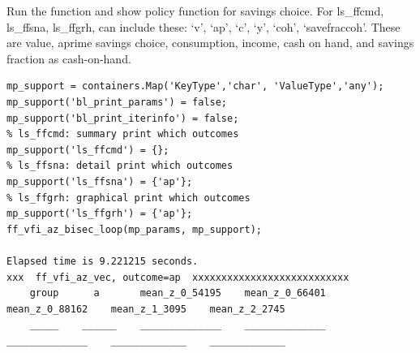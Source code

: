\documentclass[
]{book}
\begin{document}
Run the function and show policy function for savings choice. For
ls\_ffcmd, ls\_ffsna, ls\_ffgrh, can include these: `v', `ap', `c', `y',
`coh', `savefraccoh'. These are value, aprime savings choice,
consumption, income, cash on hand, and savings fraction as cash-on-hand.

\begin{verbatim}
mp_support = containers.Map('KeyType','char', 'ValueType','any');
mp_support('bl_print_params') = false;
mp_support('bl_print_iterinfo') = false;
% ls_ffcmd: summary print which outcomes
mp_support('ls_ffcmd') = {};
% ls_ffsna: detail print which outcomes
mp_support('ls_ffsna') = {'ap'};
% ls_ffgrh: graphical print which outcomes
mp_support('ls_ffgrh') = {'ap'};
ff_vfi_az_bisec_loop(mp_params, mp_support);

Elapsed time is 9.221215 seconds.
xxx  ff_vfi_az_vec, outcome=ap  xxxxxxxxxxxxxxxxxxxxxxxxxxx
    group      a       mean_z_0_54195    mean_z_0_66401    mean_z_0_88162    mean_z_1_3095    mean_z_2_2745
    _____    ______    ______________    ______________    ______________    _____________    _____________


\end{verbatim}
\end{document}
